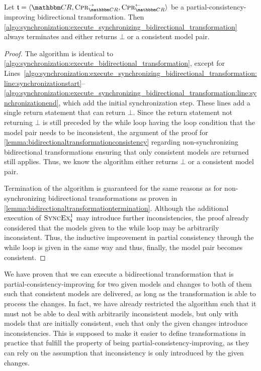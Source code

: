 \begin{theorem}[Synchronizing Transformation Termination] %
    \label{theorem:synchronizingbidirectionaltransformationconsistencytermination}
    Let $\transformation{t} = \tupled{\consistencyrelationset{CR}, \consistencypreservationrule{\consistencyrelationset{CR}}^{\rightarrow}, \consistencypreservationrule{\consistencyrelationset{CR}}^{\leftarrow}}$ be a partial-consistency-improving bidirectional transformation.
    Then \autoref{algo:synchronization:execute_synchronizing_bidirectional_transformation} always terminates and either returns $\bot$ or a consistent model pair.
\end{theorem}
\begin{proof}
    The algorithm is identical to \autoref{algo:synchronization:execute_bidirectional_transformation}, except for Lines~\ref{algo:synchronization:execute_synchronizing_bidirectional_transformation:line:synchronizationstart}--\ref{algo:synchronization:execute_synchronizing_bidirectional_transformation:line:synchronizationend}, which add the initial synchronization step.
    These lines add a single return statement that can return $\bot$.
    Since the return statement not returning $\bot$ is still preceded by the while loop having the loop condition that the model pair needs to be inconsistent, the argument of the proof for \autoref{lemma:bidirectionaltransformationconsistency} regarding non-synchronizing bidirectional transformations ensuring that only consistent models are returned still applies.
    Thus, we know the algorithm either returns $\bot$ or a consistent model pair.

    Termination of the algorithm is guaranteed for the same reasons as for non-synchronizing bidirectional transformations as proven in \autoref{lemma:bidirectionaltransformationtermination}.
    Although the additional execution of $\function{SyncEx}_{\transformation{t}}^1$ may introduce further inconsistencies, the proof already considered that the models given to the while loop may be arbitrarily inconsistent.
    Thus, the inductive improvement in partial consistency through the while loop is given in the same way and thus, finally, the model pair becomes consistent.
\end{proof}

We have proven that we can execute a bidirectional transformation that is partial-consistency-improving for two given models and changes to both of them such that consistent models are delivered, as long as the transformation is able to process the changes.
In fact, we have already restricted the algorithm such that it must not be able to deal with arbitrarily inconsistent models, but only with models that are initially consistent, such that only the given changes introduce inconsistencies.
This is supposed to make it easier to define transformations in practice that fulfill the property of being partial-consistency-improving, as they can rely on the assumption that inconsistency is only introduced by the given changes.

